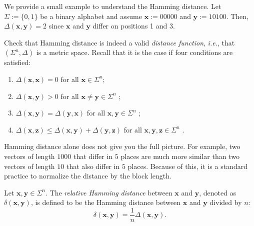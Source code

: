 \documentclass[../../book]{subfiles}
\begin{document}
\begin{example}
    We provide a small example to understand the Hamming distance. Let $\Sigma := \{0,1\}$ be a binary alphabet and assume $\mathbf{x} := 00000$ and $\mathbf{y} := 10100$.
    Then, $\Delta(\mathbf{x}, \mathbf{y}) = 2$ since $\mathbf{x}$ and $\mathbf{y}$ differ on positions 1 and 3.
\end{example}

\begin{exercise}
    Check that Hamming distance is indeed a valid \emph{distance function}, \emph{i.e.}, that $(\Sigma^n,\Delta)$ is a metric space.
    Recall that it is the case if four conditions are satisfied:
    \begin{enumerate}
      \item $\Delta(\mathbf{x},\mathbf{x}) = 0$ for all $\mathbf{x} \in \Sigma^n$;
      \item $\Delta(\mathbf{x},\mathbf{y}) > 0$ for all $\mathbf{x} \neq \mathbf{y} \in \Sigma^n$ ;
      \item $\Delta(\mathbf{x}, \mathbf{y}) = \Delta(\mathbf{y}, \mathbf{x})$ for all $\mathbf{x},\mathbf{y} \in \Sigma^n$ ;
      \item $\Delta(\mathbf{x},\mathbf{z}) \leq \Delta(\mathbf{x},\mathbf{y}) + \Delta(\mathbf{y},\mathbf{z})$ for all $\mathbf{x},\mathbf{y},\mathbf{z} \in \Sigma^n$ .
    \end{enumerate}
\end{exercise}

Hamming distance alone does not give you the full picture. For example, two vectors of length $1000$ that differ in $5$ places are much more similar than two vectors of length $10$ that also differ in $5$ places. Because of this, it is a standard practice to normalize the distance by the block length.

\begin{definition}\label{def:rel-distance}
  Let $\mathbf{x}, \mathbf{y} \in \Sigma^n$. The \emph{relative Hamming distance} between $\mathbf{x}$ and $\mathbf{y}$, denoted as $\delta(\mathbf{x}, \mathbf{y})$, is defined to be the Hamming distance between $\mathbf{x}$ and $\mathbf{y}$ divided by $n$:
  \begin{equation*}
    \delta(\mathbf{x}, \mathbf{y}) = \frac{1}{n} \Delta(\mathbf{x}, \mathbf{y}).
  \end{equation*}
\end{definition}
\end{document}
